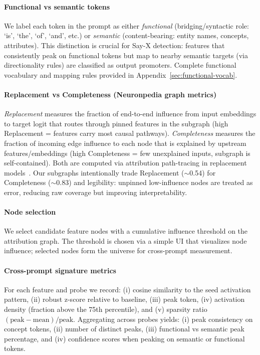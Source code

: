 \paragraph{Functional vs semantic tokens}
We label each token in the prompt as either \emph{functional} (bridging/syntactic role: `is', `the', `of', `and', etc.) or \emph{semantic} (content-bearing: entity names, concepts, attributes). This distinction is crucial for Say-X detection: features that consistently peak on functional tokens but map to nearby semantic targets (via directionality rules) are classified as output promoters. Complete functional vocabulary and mapping rules provided in Appendix~\ref{sec:functional-vocab}.

\paragraph{Replacement vs Completeness (Neuronpedia graph metrics)}
\emph{Replacement} measures the fraction of end-to-end influence from input embeddings to target logit that routes through pinned features in the subgraph (high Replacement = features carry most causal pathways). \emph{Completeness} measures the fraction of incoming edge influence to each node that is explained by upstream features/embeddings (high Completeness = few unexplained inputs, subgraph is self-contained). Both are computed via attribution path-tracing in replacement models~\cite{ameisen2025circuittracing}. Our subgraphs intentionally trade Replacement ($\sim$0.54) for Completeness ($\sim$0.83) and legibility: unpinned low-influence nodes are treated as error, reducing raw coverage but improving interpretability.

\paragraph{Node selection}
We select candidate feature nodes with a cumulative influence threshold on the attribution graph. The threshold is chosen via a simple UI that visualizes node influence; selected nodes form the universe for cross-prompt measurement.

\paragraph{Cross-prompt signature metrics}
For each feature and probe we record: (i) cosine similarity to the seed activation pattern, (ii) robust z-score relative to baseline, (iii) peak token, (iv) activation density (fraction above the 75th percentile), and (v) sparsity ratio $(\text{peak}-\text{mean})/\text{peak}$. Aggregating across probes yields: (i) peak consistency on concept tokens, (ii) number of distinct peaks, (iii) functional vs semantic peak percentage, and (iv) confidence scores when peaking on semantic or functional tokens.

